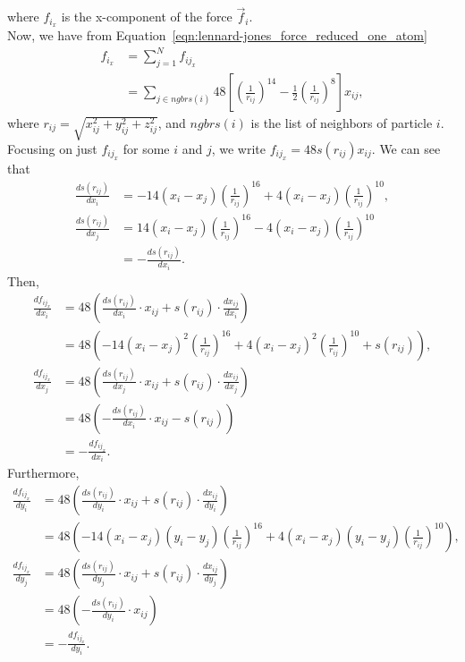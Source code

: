 \documentclass[../Main.tex]{subfiles}
\begin{document}
where $f_{i_{x}}$ is the x-component of the force $\vec{f}_{i}$. \\
Now, we have from Equation~\ref{eqn:lennard-jones_force_reduced_one_atom}
\begin{align*}
f_{i_{x}} &= \sum_{j=1}^{N} f_{ij_{x}} \\
&= \sum_{j\in ngbrs(i)} 48\left[ \left( \frac{1}{r_{ij}}\right)^{14} - \frac{1}{2}\left( \frac{1}{r_{ij}}\right)^{8} \right]x_{ij},
\end{align*} where $r_{ij} = \sqrt{x_{ij}^{2} + y_{ij}^{2} + z_{ij}^{2}}$, and $ngbrs(i)$ is the list of neighbors of particle $i$. \\
Focusing on just $f_{ij_{x}}$ for some $i$ and $j$, we write $f_{ij_{x}} = 48s(r_{ij})x_{ij}$. We can see that
\begin{align*}
\frac{ds(r_{ij})}{dx_{i}} & = -14\left(x_{i} - x_{j}\right)\left(\frac{1}{r_{ij}}\right)^{16}+ 4\left(x_{i} - x_{j}\right)\left(\frac{1}{r_{ij}}\right)^{10}, \\
\frac{ds(r_{ij})}{dx_{j}} & = 14\left(x_{i} - x_{j}\right)\left(\frac{1}{r_{ij}}\right)^{16} - 4\left(x_{i} - x_{j}\right)\left(\frac{1}{r_{ij}}\right)^{10} \\
& = - \frac{ds(r_{ij})}{dx_{i}}.
\end{align*}
Then,
\begin{align}
\frac{df_{ij_{x}}}{dx_{i}} &= 48\left(\frac{ds(r_{ij})}{dx_{i}}\cdot x_{ij} + s(r_{ij})\cdot \frac{dx_{ij}}{dx_{i}}\right) \nonumber \\
&= 48\left(-14\left(x_{i} - x_{j}\right)^{2}\left(\frac{1}{r_{ij}}\right)^{16}+ 4\left(x_{i} - x_{j}\right)^{2}\left(\frac{1}{r_{ij}}\right)^{10} +  s(r_{ij})\right), \nonumber \\
\frac{df_{ij_{x}}}{dx_{j}} &= 48\left(\frac{ds(r_{ij})}{dx_{j}}\cdot x_{ij} + s(r_{ij})\cdot \frac{dx_{ij}}{dx_{j}}\right) \nonumber \\
&= 48\left(- \frac{ds(r_{ij})}{dx_{i}}\cdot x_{ij} - s(r_{ij})\right) \nonumber \\
&= -\frac{df_{ij_{x}}}{dx_{i}}. \label{eqn:negative_j_point_derivative_x}
\end{align}
Furthermore,
\begin{align}
\frac{df_{ij_{x}}}{dy_{i}} &= 48\left(\frac{ds(r_{ij})}{dy_{i}}\cdot x_{ij} + s(r_{ij})\cdot \frac{dx_{ij}}{dy_{i}}\right) \nonumber \\
&= 48\left(-14\left(x_{i} - x_{j}\right)\left(y_{i} - y_{j}\right)\left(\frac{1}{r_{ij}}\right)^{16}+ 4\left(x_{i} - x_{j}\right)\left(y_{i} - y_{j}\right)\left(\frac{1}{r_{ij}}\right)^{10}\right), \nonumber \\
\frac{df_{ij_{x}}}{dy_{j}} &= 48\left(\frac{ds(r_{ij})}{dy_{j}}\cdot x_{ij} + s(r_{ij})\cdot \frac{dx_{ij}}{dy_{j}}\right) \nonumber \\
&= 48\left(-\frac{ds(r_{ij})}{dy_{i}}\cdot x_{ij}\right) \nonumber\\
& = -\frac{df_{ij_{x}}}{dy_{i}}. \label{eqn:negative_j_point_derivative_y}
\end{align}
\end{document}
